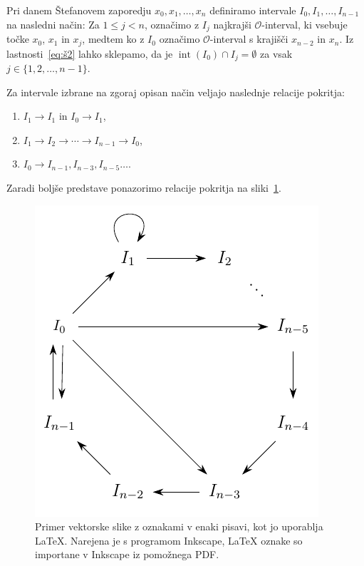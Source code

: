 \documentclass[mat2]{fmfdelo}
\DeclareMathOperator{\interior}{int}
\begin{document}
Pri danem Štefanovem zaporedju $x_0, x_1, \dots, x_n$ definiramo intervale $I_0, I_1, \dots, I_{n-1}$ na  nasledni način: Za $1 \leq j < n$, označimo z $I_j$ najkrajši $\mathcal{O}$-interval, ki vsebuje točke $x_0$, $x_1$ in $x_j$, medtem ko z $I_0$ označimo $\mathcal{O}$-interval s krajišči $x_{n-2}$ in $x_n$. Iz lastnosti~\ref{eq:š2} lahko sklepamo, da je $\interior(I_0) \cap I_j = \emptyset$ za vsak $j \in \{1, 2, \dots, n-1\}$.

\begin{trditev}\label{trd:pokritja}
Za intervale izbrane na zgoraj opisan način veljajo naslednje relacije pokritja:
\begin{enumerate}
\item $I_1 \to I_1$ in $I_0 \to I_1$,\label{trd:pokritja1}
\item $I_1 \to I_2 \to \cdots \to I_{n-1} \to I_0$,\label{trd:pokritja3}
\item $I_0 \to I_{n-1}, I_{n-3}, I_{n-5} \dots $.\label{trd:pokritja2}
\end{enumerate}
Zaradi boljše predstave ponazorimo relacije pokritja na sliki~\ref{fig:nkotnik}.
\end{trditev}

\begin{figure}[h]
  \centering
  \includegraphics{images/graph_n.pdf}
  \caption[Primer vektorske slike.]{Primer vektorske slike z oznakami v enaki pisavi, kot jo
     uporablja \LaTeX{}.  Narejena je s programom Inkscape, \LaTeX{} oznake so importane v
     Inkscape iz pomožnega PDF.}
  \label{fig:nkotnik}
\end{figure}
\end{document}
